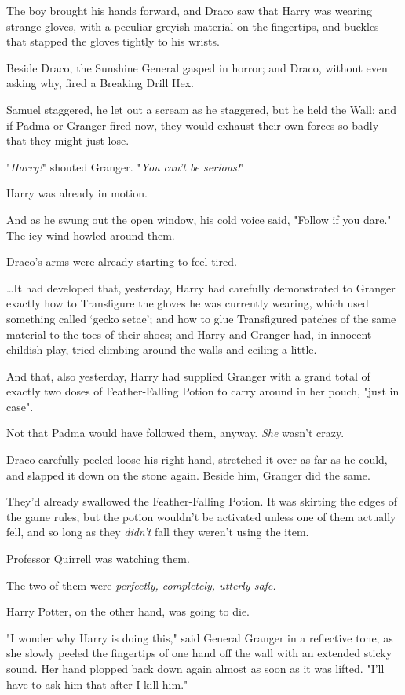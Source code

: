 The boy brought his hands forward, and Draco saw that Harry was wearing strange
gloves, with a peculiar greyish material on the fingertips, and buckles that
stapped the gloves tightly to his wrists.

Beside Draco, the Sunshine General gasped in horror; and Draco, without even
asking why, fired a Breaking Drill Hex.

Samuel staggered, he let out a scream as he staggered, but he held the Wall;
and if Padma or Granger fired now, they would exhaust their own forces so badly
that they might just lose.

"\emph{Harry!}" shouted Granger. "\emph{You can't be serious!}"

Harry was already in motion.

And as he swung out the open window, his cold voice said, "Follow if you dare."
\later
The icy wind howled around them.

Draco's arms were already starting to feel tired.

…It had developed that, yesterday, Harry had carefully demonstrated to
Granger exactly how to Transfigure the gloves he was currently wearing, which
used something called `gecko setae'; and how to glue Transfigured patches of
the same material to the toes of their shoes; and Harry and Granger had, in
innocent childish play, tried climbing around the walls and ceiling a little.

And that, also yesterday, Harry had supplied Granger with a grand total of
exactly two doses of Feather-Falling Potion to carry around in her pouch, "just
in case".

Not that Padma would have followed them, anyway. \emph{She} wasn't crazy.

Draco carefully peeled loose his right hand, stretched it over as far as he
could, and slapped it down on the stone again. Beside him, Granger did the same.

They'd already swallowed the Feather-Falling Potion. It was skirting the edges
of the game rules, but the potion wouldn't be activated unless one of them
actually fell, and so long as they \emph{didn't} fall they weren't using the
item.

Professor Quirrell was watching them.

The two of them were \emph{perfectly, completely, utterly safe.}

Harry Potter, on the other hand, was going to die.

"I wonder why Harry is doing this," said General Granger in a reflective tone,
as she slowly peeled the fingertips of one hand off the wall with an extended
sticky sound. Her hand plopped back down again almost as soon as it was lifted.
"I'll have to ask him that after I kill him."

